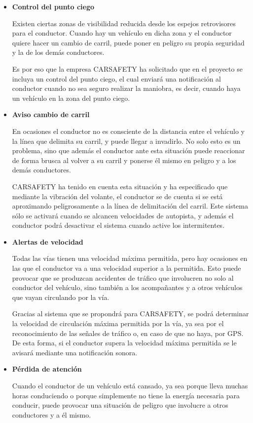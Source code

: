 \begin{itemize}[-]
\item \textbf{Control del punto ciego}
\par Existen ciertas zonas de visibilidad reducida desde los espejos retrovisores para el conductor. Cuando hay un vehículo en dicha zona y el conductor quiere hacer un cambio de carril, puede poner en peligro su propia seguridad y la de los demás conductores.
\par Es por eso que la empresa CARSAFETY ha solicitado que en el proyecto se incluya un control del punto ciego, el cual enviará una notificación al conductor cuando no sea seguro realizar la maniobra, es decir, cuando haya un vehículo en la zona del punto ciego.
\item \textbf{Aviso cambio de carril}
\par En ocasiones el conductor no es consciente de la distancia entre el vehículo y la línea que delimita su carril, y puede llegar a invadirlo. No solo esto es un problema, sino que además el conductor ante esta situación puede reaccionar de forma brusca al volver a su carril y ponerse él mismo en peligro y a los demás conductores.
\par CARSAFETY ha tenido en cuenta esta situación y ha especificado que mediante la vibración del volante, el conductor se de cuenta si se está aproximando peligrosamente a la línea de delimitación del carril. Este sistema sólo se activará cuando se alcancen velocidades de autopista, y además el conductor podrá desactivar el sistema cuando active los intermitentes.
\item \textbf{Alertas de velocidad}
\par Todas las vías tienen una velocidad máxima permitida, pero hay ocasiones en las que el conductor va a una velocidad superior a la permitida. Esto puede provocar que se produzcan accidentes de tráfico que involucren no solo al conductor del vehículo, sino también a los acompañantes y a otros vehículos que vayan circulando por la vía.
\par Gracias al sistema que se propondrá para CARSAFETY, se podrá determinar la velocidad de circulación máxima permitida por la vía, ya sea por el reconocimiento de las señales de tráfico o, en caso de que no haya, por GPS. De esta forma, si el conductor supera la velocidad máxima permitida se le avisará mediante una notificación sonora.
\item \textbf{Pérdida de atención}
\par Cuando el conductor de un vehículo está cansado, ya sea porque lleva muchas horas conduciendo o porque simplemente no tiene la energía necesaria para conducir, puede provocar una situación de peligro que involucre a otros conductores y a él mismo.

\end{itemize}
